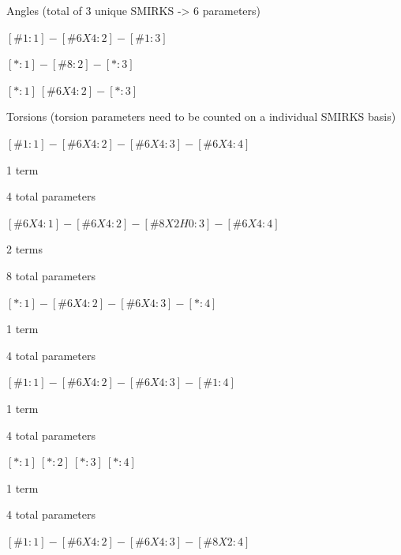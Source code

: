 \documentclass{report}
\begin{document}
\begin{outline}
\begin{outline}
    \item{Angles (total of 3 unique SMIRKS -> 6 parameters)}
      \begin{outline}
        \item{$[\#1:1]-[\#6X4:2]-[\#1:3]$}
        \item{$[*:1]-[\#8:2]-[*:3]$}
        \item{$[*:1]~[\#6X4:2]-[*:3]$}
      \end{outline}
    \item{Torsions (torsion parameters need to be counted on a individual SMIRKS basis)}
      \begin{outline}
        \item{$[\#1:1]-[\#6X4:2]-[\#6X4:3]-[\#6X4:4]$}
          \begin{outline}
            \item{1 term}
            \item{4 total parameters}
          \end{outline}
        \item{$[\#6X4:1]-[\#6X4:2]-[\#8X2H0:3]-[\#6X4:4]$}
          \begin{outline}
            \item{2 terms}
            \item{8 total parameters}
          \end{outline}
        \item{$[*:1]-[\#6X4:2]-[\#6X4:3]-[*:4]$}
          \begin{outline}
            \item{1 term}
            \item{4 total parameters}
          \end{outline}
        \item{$[\#1:1]-[\#6X4:2]-[\#6X4:3]-[\#1:4]$}
          \begin{outline}
            \item{1 term}
            \item{4 total parameters}
          \end{outline}
        \item{$[*:1]~[*:2]~[*:3]~[*:4]$}
          \begin{outline}
            \item{1 term}
            \item{4 total parameters}
          \end{outline}
        \item{$[\#1:1]-[\#6X4:2]-[\#6X4:3]-[\#8X2:4]$}
          \begin{outline}

\end{outline}
\end{outline}
\end{outline}
\end{outline}
\end{document}

